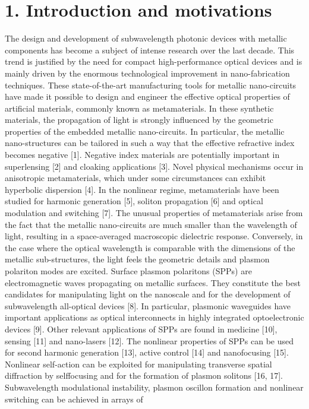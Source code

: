 \documentclass[10pt]{article}
\begin{document}
\section*{1. Introduction and motivations}
The design and development of subwavelength photonic devices with metallic components has become a subject of intense research over the last decade. This trend is justified by the need for compact high-performance optical devices and is mainly driven by the enormous technological improvement in nano-fabrication techniques. These state-of-the-art manufacturing tools for metallic nano-circuits have made it possible to design and engineer the effective optical properties of artificial materials, commonly known as metamaterials. In these synthetic materials, the propagation of light is strongly influenced by the geometric properties of the embedded metallic nano-circuits. In particular, the metallic nano-structures can be tailored in such a way that the effective refractive index becomes negative [1]. Negative index materials are potentially important in superlensing [2] and cloaking applications [3]. Novel physical mechanisms occur in anisotropic metamaterials, which under some circumstances can exhibit hyperbolic dispersion [4]. In the nonlinear regime, metamaterials have been studied for harmonic generation [5], soliton propagation [6] and optical modulation and switching [7]. The unusual properties of metamaterials arise from the fact that the metallic nano-circuits are much smaller than the wavelength of light, resulting in a space-averaged macroscopic dielectric response. Conversely, in the case where the optical wavelength is comparable with the dimensions of the metallic sub-structures, the light feels the geometric details and plasmon polariton modes are excited. Surface plasmon polaritons (SPPs) are electromagnetic waves propagating on metallic surfaces. They constitute the best candidates for manipulating light on the nanoscale and for the development of subwavelength all-optical devices [8]. In particular, plasmonic waveguides have important applications as optical interconnects in highly integrated optoelectronic devices [9]. Other relevant applications of SPPs are found in medicine [10], sensing [11] and nano-lasers [12]. The nonlinear properties of SPPs can be used for second harmonic generation [13], active control [14] and nanofocusing [15]. Nonlinear self-action can be exploited for manipulating transverse spatial diffraction by selffocusing and for the formation of plasmon solitons [16, 17]. Subwavelength modulational instability, plasmon oscillon formation and nonlinear switching can be achieved in arrays of\\[0pt]
\end{document}
